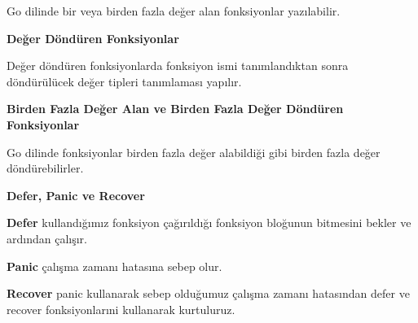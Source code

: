 Go dilinde bir veya birden fazla değer alan fonksiyonlar yazılabilir.
\vspace{5mm}



\vspace{10mm}
\textbf{Değer Döndüren Fonksiyonlar}
\vspace{5mm}

Değer döndüren fonksiyonlarda fonksiyon ismi tanımlandıktan sonra döndürülücek değer tipleri tanımlaması yapılır.
\vspace{5mm}


\vspace{20mm}
\textbf{Birden Fazla Değer Alan ve Birden Fazla Değer Döndüren Fonksiyonlar}
\vspace{5mm}

Go dilinde fonksiyonlar birden fazla değer alabildiği gibi birden fazla değer döndürebilirler.
\vspace{5mm}





\vspace{10mm}
\textbf{Defer, Panic ve Recover}
\vspace{5mm}

\textbf{Defer} kullandığımız fonksiyon çağırıldığı fonksiyon bloğunun bitmesini bekler ve ardından çalışır.
\vspace{5mm}


\vspace{10mm}
\textbf{Panic} çalışma zamanı hatasına sebep olur.
\vspace{5mm}


\vspace{10mm}
\textbf{Recover} panic kullanarak sebep olduğumuz çalışma zamanı hatasından defer ve recover fonksiyonlarıni kullanarak kurtuluruz.
\vspace{5mm}


